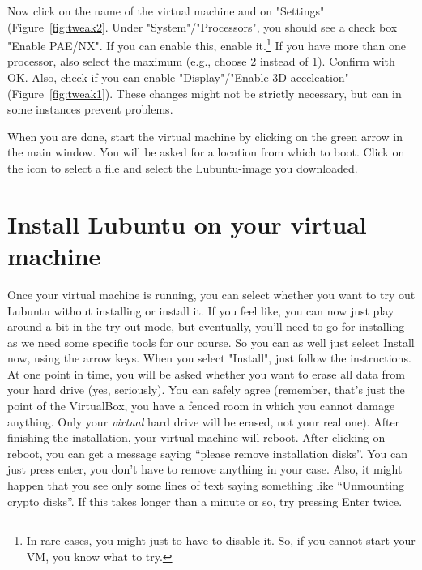\documentclass[a4paper,12pt]{book}
\begin{document}
Now click on the name of the virtual machine and on "Settings" (Figure~\ref{fig:tweak2}. Under "System"/"Processors", you should see a check box "Enable PAE/NX". If you can enable this, enable it.\footnote{In rare cases, you might just to have to disable it. So, if you cannot start your VM, you know what to try.} If you have more than one processor, also select the maximum (e.g., choose 2 instead of 1). Confirm with OK. Also, check if you can enable "Display"/"Enable 3D acceleation" (Figure~\ref{fig:tweak1}). These changes might not be strictly necessary, but can in some instances prevent problems.

When you are done, start the virtual machine by clicking on the green arrow in the main window. You will be asked for a location from which to boot. Click on the icon to select a file and select the Lubuntu-image you downloaded.


\section{Install Lubuntu on your virtual machine}
Once your virtual machine is running, you can select whether you want to try out Lubuntu without installing or install it. If you feel like, you can now just play around a bit in the try-out mode, but eventually, you'll need to go for installing as we need some specific tools for our course. So you can as well just select Install now, using the arrow keys.
When you select "Install", just follow the instructions. At one point in time, you will be asked whether you want to erase all data from your hard drive (yes, seriously). You can safely agree (remember, that's just the point of the VirtualBox, you have a fenced room in which you cannot damage anything. Only your \emph{virtual} hard drive will be erased, not your real one).
After finishing the installation, your virtual machine will reboot. After clicking on reboot, you can get a message saying ``please remove installation disks''. You can just press enter, you don't have to remove anything in your case. Also, it might happen that you see only some lines of text saying something like ``Unmounting crypto disks''. If this takes longer than a minute or so, try pressing Enter twice. 
\end{document}
